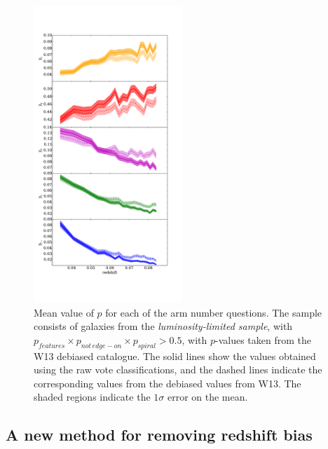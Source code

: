 \documentclass[useAMS,usenatbib]{mn2e}
\begin{document}
\begin{figure}
		\centering

        \includegraphics[width=0.5\textwidth]{Images/Bias/Biases/mean_arm_fractions.pdf}

        \caption{Mean value of $p$ for each of the arm number questions. The sample consists of galaxies from the \textit{luminosity-limited sample}, with $p_{features} \times p_{not \, edge-on} \times p_{spiral} > 0.5$, with $p$-values taken from the W13 debiased catalogue. The solid lines show the values obtained using the raw vote classifications, and the dashed lines indicate the corresponding values from the debiased values from W13. The shaded regions indicate the $1 \sigma$ error on the mean.}

        \label{fig:arm_bias}

\end{figure}

\subsection{A new method for removing redshift bias}
\label{sec:new_method}
\end{document}
